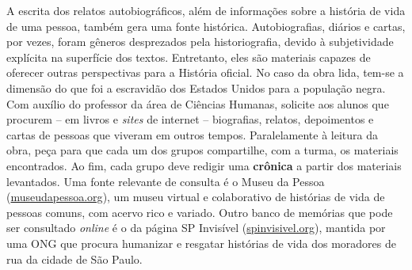 \documentclass[11pt]{extarticle}
\begin{document}

A escrita dos relatos autobiográficos, além de informações
sobre a história de vida de uma pessoa, também gera uma fonte histórica.
Autobiografias, diários e cartas, por vezes, foram gêneros desprezados
pela historiografia, devido à subjetividade explícita na superfície dos
textos. Entretanto, eles são materiais capazes de oferecer outras
perspectivas para a História oficial. No caso da obra lida, tem-se a
dimensão do que foi a escravidão dos Estados Unidos para a população
negra. Com auxílio do professor da área de Ciências Humanas, solicite
aos alunos que procurem -- em livros e \emph{sites} de internet --
biografias, relatos, depoimentos e cartas de pessoas que viveram em
outros tempos. Paralelamente à leitura da obra, peça para que cada um
dos grupos compartilhe, com a turma, os materiais encontrados. Ao fim,
cada grupo deve redigir uma \textbf{crônica} a partir dos materiais
levantados. Uma fonte relevante de consulta é o Museu da Pessoa
(\href{http://www.museudapessoa.org}{museudapessoa.org}), um museu
virtual e colaborativo de histórias de vida de pessoas comuns, com
acervo rico e variado. Outro banco de memórias que pode ser consultado
\emph{online} é o da página SP Invisível
(\href{http://www.spinvisivel.org}{spinvisivel.org}), mantida por
uma ONG que procura humanizar e resgatar histórias de vida dos moradores
de rua da cidade de São Paulo.
\end{document}
